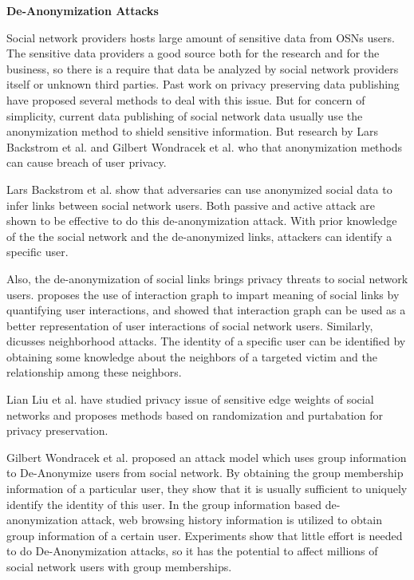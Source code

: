 \documentclass[12pt]{article}
\begin{document}
\textbf{De-Anonymization Attacks}

Social network providers hosts large amount of sensitive data from
OSNs users. The sensitive data providers a good source both for the
research and for the business, so there is a require that data be
analyzed by social network providers itself or unknown third
parties. Past work on privacy preserving data publishing
\cite{ppdp-survey} have proposed several methods to deal with this
issue. But for concern of simplicity, current data publishing of
social network data usually use the anonymization method to shield
sensitive information. But research by Lars Backstrom 
et al. \cite{anony-link-attack} and Gilbert Wondracek et al.
\cite{group-deanonymization-attack} who that anonymization methods can
cause breach of user privacy. 

Lars Backstrom et al. \cite{anony-link-attack} show that adversaries
can use anonymized social data to infer links between social network
users. Both passive and active attack are shown to be effective to do
this de-anonymization attack. With prior knowledge of the the social
network and the de-anonymized links, attackers can identify a specific
user. 

Also, the de-anonymization of social links brings privacy threats to
social network users.  \cite{user-interaction-social-link} proposes
the use of interaction graph to impart meaning of social links by
quantifying user interactions, and showed that interaction graph can
be used as a better representation of user interactions of social
network users. Similarly, \cite{neighborhood-attack} dicusses
neighborhood attacks. The identity of a specific user can be
identified by obtaining some knowledge about the neighbors of a
targeted victim and the relationship among these neighbors.

Lian Liu et al.\cite{privacy-sensitive-edge} have studied privacy
issue of sensitive edge weights of social networks and proposes
methods based on randomization and purtabation for privacy
preservation.

Gilbert Wondracek et al.\cite{group-deanonymization-attack} proposed an
attack model which uses group information to De-Anonymize users from
social network. By obtaining the group membership information of a
particular user, they show that it is usually sufficient to uniquely
identify the identity of this user. In the group information based
de-anonymization attack, web browsing history information is utilized
to obtain group information of a certain user. Experiments show that
little effort is needed to do De-Anonymization attacks, so it has the
potential to affect millions of social network users with group
memberships.
\end{document}
